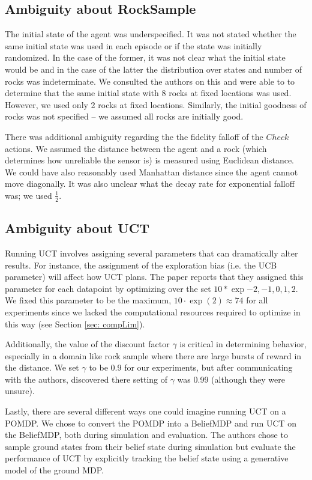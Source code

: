 \documentclass[11pt]{article} %
\begin{document}
\subsection{Ambiguity about RockSample}
The initial state of the agent was underspecified. It was not stated whether the same initial state was used in each episode or if the state was initially randomized. In the case of the former, it was not clear what the initial state would be and in the case of the latter the distribution over states and number of rocks was indeterminate. We consulted the authors on this and were able to to determine that the same initial state with 8 rocks at fixed locations was used. However, we used only 2 rocks at fixed locations. Similarly, the initial goodness of rocks was not specified -- we assumed all rocks are initially good.

There was additional ambiguity regarding the the fidelity falloff of the $Check$ actions. We assumed the distance between the agent and a rock (which determines how unreliable the sensor is) is measured using Euclidean distance. We could have also reasonably used Manhattan distance since the agent cannot move diagonally. It was also unclear what the decay rate for exponential falloff was; we used $\frac{1}{2}$.

\subsection{Ambiguity about UCT}

Running UCT involves assigning several parameters that can dramatically alter results. For instance, the assignment of the exploration bias (i.e. the UCB parameter) will affect how UCT plans. The paper reports that they assigned this parameter for each datapoint by optimizing over the set $10 * \exp{-2, -1, 0, 1, 2}$. We fixed this parameter to be the maximum, $10 \cdot \exp(2) \approx 74$ for all experiments since we lacked the computational resources required to optimize in this way (see Section \ref{sec: compLim}).

Additionally, the value of the discount factor $\gamma$ is critical in determining behavior, especially in a domain like rock sample where there are large bursts of reward in the distance. We set $\gamma$ to be $0.9$ for our experiments, but after communicating with the authors, discovered there setting of $\gamma$ was 0.99 (although they were unsure). 

Lastly, there are several different ways one could imagine running UCT on a POMDP. We chose to convert the POMDP into a BeliefMDP and run UCT on the BeliefMDP, both during simulation and evaluation. The authors chose to sample ground states from their belief state during simulation but evaluate the performance of UCT by explicitly tracking the belief state using a generative model of the ground MDP.
\end{document}
